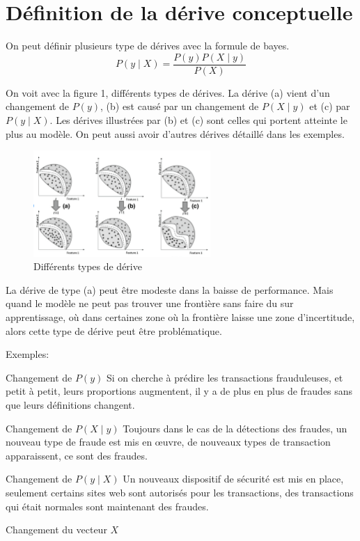 \documentclass[11pt,a4paper]{report}
\date{2018}
\begin{document}
\tableofcontents

\chapter*{Définition de la dérive conceptuelle}

On peut définir plusieurs type de dérives avec la formule de bayes.
$$
P(y \mid X)=\frac{ P(y)P(X\mid y)}{P(X)}
$$
 
 On voit avec la figure 1, différents types de dérives. La dérive (a) vient d'un changement de $P(y)$, (b) est causé par un changement de $P(X\mid y)$ et (c) par $P(y \mid X)$. Les dérives illustrées par (b) et (c) sont celles qui portent atteinte le plus au modèle. On peut aussi avoir d'autres dérives détaillé dans les exemples.

\begin{figure}[h]
\caption{Différents types de dérive}
\centering
\includegraphics[width=0.6\textwidth]{different_types_of_drift}
\end{figure}

La dérive de type (a) peut être modeste dans la baisse de performance. Mais quand le modèle ne peut pas trouver une frontière sans faire du sur apprentissage, où dans certaines zone où la frontière laisse une zone d'incertitude, alors cette type de dérive peut être problématique.

Exemples:
\begin{list}{•}
\item[Changement de $P(y)$] Si on cherche à prédire les transactions frauduleuses, et petit à petit, leurs proportions augmentent, il y a de plus en plus de fraudes sans que leurs définitions changent.
\item[Changement de $P(X\mid y)$] Toujours dans le cas de la détections des fraudes, un nouveau type de fraude est mis en œuvre, de nouveaux types de transaction apparaissent, ce sont des fraudes.
\item[Changement de $P(y \mid X)$] Un nouveaux dispositif de sécurité est mis en place, seulement certains sites web sont autorisés pour les transactions, des transactions qui était normales sont maintenant des fraudes.
\item[Changement du vecteur $X$] 
\end{list}
\end{document}
